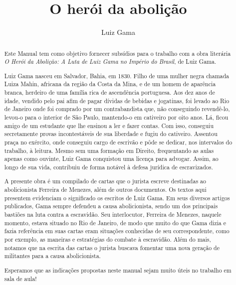 \documentclass[12pt]{extarticle}
\begin{document}
\newcommand{\AutorLivro}{Luiz Gama}
\newcommand{\TituloLivro}{O herói da abolição}
\newcommand{\Tema}{Diálogos com a sociologia e com a antropologia}
\newcommand{\Genero}{Diário, biografia, autobiografia, relatos, memórias}
\newcommand{\imagemCapa}{./images/PNLD0016-01.png}
\newcommand{\issnppub}{---}
\newcommand{\issnepub}{---}
\newcommand{\colaborador}{\textbf{Eduardo Modesto de Carvalho, Bruno Gradella e Vicente Castro}}


\title{\TituloLivro}
\author{\AutorLivro}
\def\authornotes{\colaborador}

\date{}
\maketitle

\begin{abstract}
Este Manual tem como objetivo fornecer subsídios para o trabalho com a
obra literária \emph{O Herói da Abolição: A Luta de Luiz Gama no Império
do Brasil}, de Luiz Gama.

Luiz Gama nasceu em Salvador, Bahia, em 1830. Filho de uma mulher negra chamada 
Luiza Mahin, africana da região da Costa da Mina, e de um homem de aparência branca, 
herdeiro de uma família rica de ascendência portuguesa. Aos dez anos de idade, vendido 
pelo pai afim de pagar dívidas de bebidas e jogatinas, foi levado ao Rio de Janeiro 
onde foi comprado por um contrabandista que, não conseguindo revendê-lo, levou-o
para o interior de São Paulo, mantendo-o em cativeiro por oito anos. Lá, ficou amigo 
de um estudante que lhe ensinou a ler e fazer contas. Com isso, conseguiu secretamente 
provas incontestáveis de sua liberdade e fugiu do cativeiro. Assentou praça no exército, 
onde conseguiu cargo de escrivão e pôde se dedicar, nos intervalos do trabalho, à leitura. 
Mesmo sem uma formação em Direito, frequentando as aulas apenas como ouvinte, 
Luiz Gama conquistou uma licença para advogar. Assim, ao longo de sua vida,
contribuiu de forma notável à defesa jurídica de escravizados. 

A presente obra é um compilado de cartas que o jurista escreve 
destinadas ao abolicionista Ferreira de Menezes, além de outros documentos. Os 
textos aqui presentem evidenciam o significado os escritos de Luiz Gama. 
Em seus diversos artigos publicados, Gama 
sempre defendeu a causa abolicionista, sendo um dos principais bastiões na luta 
contra a escravidão. Seu interlocutor, Ferreira de Menezes, naquele momento, 
estava situado no Rio de Janeiro, de modo que muito do que Gama dizia e fazia 
referência em suas cartas eram situações conhecidas de seu correspondente, 
como por exemplo, as maneiras e estratégias do combate à escravidão. 
Além do mais, notamos que na escrita das cartas o jurista buscava fomentar uma 
nova geração de militantes para a causa abolicionista.

Esperamos que as indicações propostas neste manual sejam muito úteis no trabalho em
sala de aula! 
\end{abstract}
\end{document}
